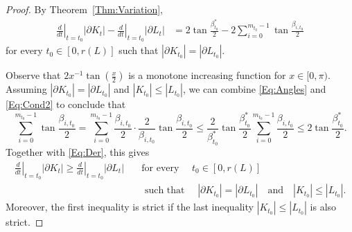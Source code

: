 \documentclass[12pt]{amsart}
\renewcommand{\ge}{\geqslant}
\renewcommand{\le}{\leqslant}
\theoremstyle{theorem}
\theoremstyle{Intro}
\theoremstyle{definition}
\theoremstyle{remark}
\theoremstyle{claim}
\numberwithin{equation}{section}
\begin{document}
\begin{proof}
By Theorem~\ref{Thm:Variation},
\begin{equation}
\label{Eq:Der}
\begin{aligned}
    \left.\frac{d}{dt}\right|_{t=t_0}|\partial K_t| - \left.\frac{d}{dt}\right|_{t=t_0}|\partial L_t| &= 2 \tan \frac{\beta^*_{t_0}}{2} - 2 \sum_{i=0}^{m_{t_0}-1} \tan \frac{\beta_{i,t_0}}{2}
\end{aligned}
\end{equation}
for every $t_0 \in [0, r(L)]$ such that $|\partial K_{t_0}|= |\partial L_{t_0}|$.



Observe that $2x^{-1}\tan(\frac{x}2)$ is a monotone increasing function for $x \in [0, \pi)$. Assuming $|\partial K_{t_0}| = |\partial L_{t_0}|$ and $|K_{t_0}| \le |L_{t_0}|$, we can combine \eqref{Eq:Angles} and \eqref{Eq:Cond2} to conclude that 
\[
\sum_{i=0}^{m_{t_0}-1} \tan \frac{\beta_{i,t_0}}{2} =\sum_{i=0}^{m_{t_0}-1} \frac{\beta_{i,t_0}}{2} \cdot \frac{2}{\beta_{i,t_0}} \tan \frac{\beta_{i,t_0}}{2} \le \frac{2}{\beta^*_{t_0}} \tan \frac{\beta^*_{t_0}}{2} \sum_{i=0}^{m_{t_0}-1} \frac{\beta_{i,t_0}}{2} \le 2\tan \frac{\beta^*_{t_0}}{2}.
\]
Together with \eqref{Eq:Der}, this gives
\begin{equation}
    \label{Eq:Der2}
    \begin{aligned}    
    \left.\frac{d}{dt}\right|_{t=t_0}|\partial K_t| \ge  \left.\frac{d}{dt}\right|_{t=t_0}|\partial L_t| \quad &\text{for every }\quad t_0 \in [0, r(L)] \quad \\
    &\text{ such that } \quad |\partial K_{t_0}|= |\partial L_{t_0}| \quad \text{and} \quad |K_{t_0}| \le |L_{t_0}|. 
    \end{aligned}
\end{equation}
Moreover, the first inequality is strict if the last inequality $|K_{t_0}| \le |L_{t_0}|$ is also strict. 


\end{proof}
\end{document}

